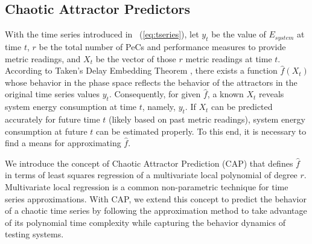 \subsection{Chaotic Attractor Predictors}
\label{sec:capps}
With the time series introduced in \equationname~(\ref{eq:tseries}), let $y_{t}$ be
the value of $E_{system}$ at time $t$, $r$ be the total number of PeCs and
performance measures to provide metric readings,
and $X_{t}$ be the vector of those $r$ metric readings at time $t$.
According to Taken's Delay Embedding Theorem \cite{Sprott2003},
there exists a function $\hat{f}(X_{t})$ whose behavior in the phase
space reflects the behavior of the attractors in the original time
series values $y_{t}$.
Consequently, for given $\hat{f}$, a known $X_{t}$ reveals system energy
consumption at time $t$, namely, $y_{t}$.
If $X_{t}$ can be predicted accurately for future time $t$
(likely based on past metric readings), system energy consumption
at future $t$ can be estimated properly.
To this end, it is necessary to find a means for approximating $\hat{f}$.

We introduce the concept of Chaotic Attractor Prediction (CAP) that
defines $\hat{f}$ in terms of least squares regression of a
multivariate local polynomial of degree $r$.  Multivariate local 
regression is a common non-parametric technique for time series
approximations.  With CAP, we extend this concept to predict the
behavior of a chaotic time series by following the approximation method
to take advantage of its polynomial time complexity while capturing the behavior
dynamics of testing systems.

